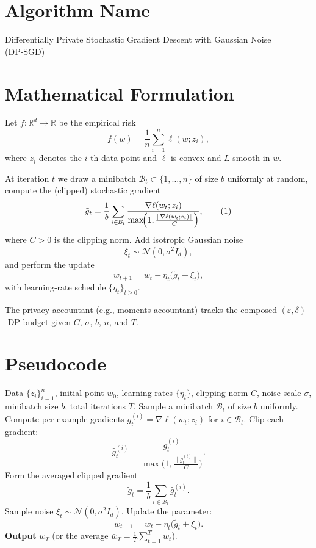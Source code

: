 \documentclass{article}
\newcommand{\RR}{\mathbb{R}}
\begin{document}
\section*{Algorithm Name}
Differentially Private Stochastic Gradient Descent with Gaussian Noise (DP‑SGD)

\section*{Mathematical Formulation}
Let $f:\RR^{d}\rightarrow\RR$ be the empirical risk  
\[
f(w)=\frac1n\sum_{i=1}^{n} \ell(w;z_i),
\]
where $z_i$ denotes the $i$‑th data point and $\ell$ is convex and $L$‑smooth in $w$.  

At iteration $t$ we draw a minibatch $\mathcal{B}_t\subset\{1,\dots,n\}$ of size $b$ uniformly at random,
compute the (clipped) stochastic gradient
\[
\tilde{g}_t=\frac{1}{b}\sum_{i\in\mathcal{B}_t}
\frac{\nabla \ell(w_t;z_i)}{\max\!\Bigl(1,\frac{\|\nabla \ell(w_t;z_i)\|}{C}\Bigr)},
\tag{1}
\]
where $C>0$ is the clipping norm.  
Add isotropic Gaussian noise
\[
\xi_t\sim\mathcal N(0,\sigma^{2}I_{d}),
\tag{2}
\]
and perform the update
\[
w_{t+1}=w_t-\eta_t\bigl(\tilde{g}_t+\xi_t\bigr),
\tag{3}
\]
with learning‑rate schedule $\{\eta_t\}_{t\ge 0}$.  

The privacy accountant (e.g., moments accountant) tracks the composed $(\varepsilon,\delta)$‑DP
budget given $C$, $\sigma$, $b$, $n$, and $T$.

\section*{Pseudocode}
\begin{algorithm}[H]
\caption{DP‑SGD}
\begin{algorithmic}[1]
\Require Data $\{z_i\}_{i=1}^{n}$, initial point $w_{0}$, learning rates $\{\eta_t\}$,
 clipping norm $C$, noise scale $\sigma$, minibatch size $b$, total iterations $T$.
    \State Sample a minibatch $\mathcal{B}_t$ of size $b$ uniformly.
    \State Compute per‑example gradients $g_{t}^{(i)}=\nabla\ell(w_t;z_i)$ for $i\in\mathcal{B}_t$.
    \State Clip each gradient:
    \[
    \hat g_{t}^{(i)}=
    \frac{g_{t}^{(i)}}{\max\!\bigl(1,\frac{\|g_{t}^{(i)}\|}{C}\bigr)} .
    \]
    \State Form the averaged clipped gradient
    \[
    \tilde g_t=\frac{1}{b}\sum_{i\in\mathcal{B}_t}\hat g_{t}^{(i)} .
    \]
    \State Sample noise $\xi_t\sim\mathcal N(0,\sigma^{2}I_{d})$.
    \State Update the parameter:
    \[
    w_{t+1}=w_t-\eta_t\bigl(\tilde g_t+\xi_t\bigr).
    \]
\EndFor
\State \textbf{Output} $w_T$ (or the average $\bar w_T=\frac{1}{T}\sum_{t=1}^{T}w_t$).
\end{algorithmic}
\end{algorithm}
\end{document}
